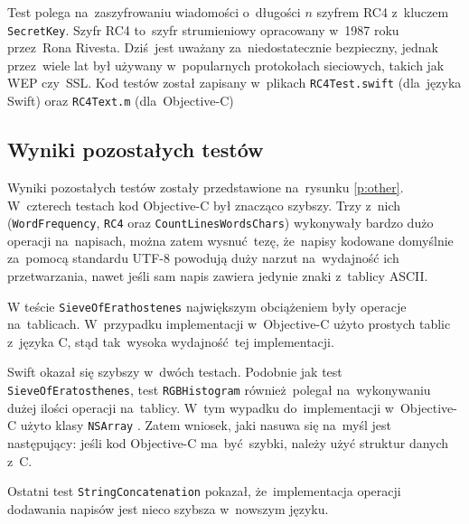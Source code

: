 \documentclass[mgr, shortabstract]{iithesis}
\newcommand{\objcinline}[1]{
    \texttt{#1}
}
\begin{document}
Test polega na~zaszyfrowaniu wiadomości o~długości $n$ szyfrem RC4 z~kluczem \texttt{SecretKey}. Szyfr RC4 to~szyfr strumieniowy opracowany w~1987 roku przez~Rona Rivesta. Dziś jest uważany za~niedostatecznie bezpieczny, jednak przez~wiele lat był używany w~popularnych protokołach sieciowych, takich jak WEP czy~SSL. Kod testów został zapisany w~plikach \texttt{RC4Test.swift} (dla~języka Swift) oraz \texttt{RC4Text.m} (dla~Objective-C)

\subsection{Wyniki pozostałych testów}

Wyniki pozostałych testów zostały przedstawione na~rysunku \ref{p:other}. W~czterech testach kod Objective-C był znacząco szybszy. Trzy z~nich (\texttt{WordFrequency}, \texttt{RC4} oraz \texttt{CountLinesWordsChars}) wykonywały bardzo dużo operacji na~napisach, można zatem wysnuć tezę, że~napisy kodowane domyślnie za~pomocą standardu UTF-8 powodują duży narzut na~wydajność ich przetwarzania, nawet jeśli sam napis zawiera jedynie znaki z~tablicy ASCII.

W teście \texttt{SieveOfErathostenes} największym obciążeniem były operacje na~tablicach. W~przypadku implementacji w~Objective-C użyto prostych tablic z~języka C, stąd tak~wysoka wydajność tej implementacji.

Swift okazał się szybszy w~dwóch testach. Podobnie jak test \texttt{SieveOfEratosthenes}, test \texttt{RGBHistogram} również polegał na~wykonywaniu dużej ilości operacji na~tablicy. W~tym wypadku do~implementacji w~Objective-C użyto klasy \objcinline{NSArray}. Zatem wniosek, jaki nasuwa się na~myśl jest następujący: jeśli kod Objective-C ma~być szybki, należy użyć struktur danych z~C.

Ostatni test \texttt{StringConcatenation} pokazał, że~implementacja operacji dodawania napisów jest nieco szybsza w~nowszym języku.
\end{document}

